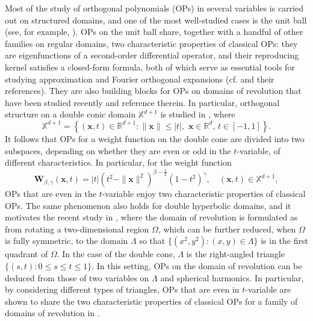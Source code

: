 \documentclass{amsart}
\theoremstyle{remark}
\def\b{{\beta}}
\def\g{{\gamma}}
\def\xb{{\mathbf x}}
\def\Wb{{\mathbf W}}
\def\RR{{\mathbb R}}
\def\XX{{\mathbb X}}
\def\f{\frac}
\begin{document}
Most of the study of orthogonal polynomials (OPs) in several variables is carried out on structured domains, and 
one of the most well-studied cases is the unit ball (see, for example, \cite{ACH, DaiX1, DaiX, DX, X05}). 
OPs on the unit ball share, together with a handful of other families on regular domains, two characteristic 
properties of classical OPs: they are eigenfunctions of a second-order differential operator, and their 
reproducing kernel satisfies a closed-form formula, both of which serve as essential tools for studying 
approximation and Fourier orthogonal expansions (cf. \cite{DaiX1, DaiX, Dit, DX, PX, W} and their references). 
They are also building blocks for OPs on domains of revolution that have been studied recently 
\cite{OX, X21a, X21, X23a, X24} and reference therein. In particular, orthogonal structure on a double conic 
domain $\XX^{d+1}$ is studied in \cite{X21a}, 
where
$$
\XX^{d+1} = \left\{(\xb, t) \in \RR^{d+1}: \|\xb\| \le |t|, \,\, \xb \in \RR^d, \, t \in [-1,1] \right\}.
$$
It follows that OPs for a weight function on the double cone are divided into two subspaces, depending 
on whether they are even or odd in the $t$-variable, of different characteristics. In particular, for the weight 
function 
$$
   \Wb_{\b,\g}(\xb, t) = |t| \left(t^2 -\|\xb\|^2\right)^{\b - \f12} \left(1-t^2\right)^\g, \quad (\xb,t) \in \XX^{d+1}, 
$$
OPs that are even in the $t$-variable enjoy two characteristic properties of classical OPs. The same phenomenon 
also holds for double hyperbolic domains, and it motivates the recent study in \cite{X24}, where the domain of 
revolution is formulated as from rotating a two-dimensional region $\Omega$, which can be further reduced, when 
$\Omega$ is fully symmetric, to the domain $\Lambda$ so that $\{(x^2,y^2): (x,y) \in \Lambda\}$ is in the first 
quadrant of $\Omega$. In the case of the double cone, $\Lambda$ is the right-angled triangle $\{(s,t): 0 \le s \le t \le 1\}$.
In this setting, OPs on the domain of revolution can be deduced from those of two variables on $\Lambda$ and 
spherical harmonics. In particular, by considering different types of triangles, OPs that are even
in $t$-variable are shown to share the two characteristic properties of classical OPs for a family of domains 
of revolution in \cite{X24}. 
\end{document}
